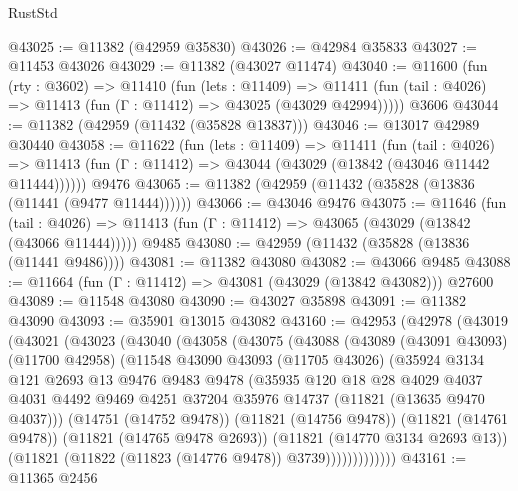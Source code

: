 \begin{lexlean}{RustStd}
\begin{coremodule}
@43025 := @11382 (@42959 @35830)
@43026 := @42984 @35833
@43027 := @11453 @43026
@43029 := @11382 (@43027 @11474)
@43040 := @11600
    (fun (rty : @3602) =>
    @11410
      (fun (lets : @11409) =>
      @11411 (fun (tail : @4026) => @11413 (fun (Γ : @11412) => @43025 (@43029 @42994)))))
    @3606
@43044 := @11382 (@42959 (@11432 (@35828 @13837)))
@43046 := @13017 @42989 @30440
@43058 := @11622
    (fun (lets : @11409) =>
    @11411
      (fun (tail : @4026) =>
      @11413 (fun (Γ : @11412) => @43044 (@43029 (@13842 (@43046 @11442 @11444))))))
    @9476
@43065 := @11382 (@42959 (@11432 (@35828 (@13836 (@11441 (@9477 @11444))))))
@43066 := @43046 @9476
@43075 := @11646
    (fun (tail : @4026) => @11413 (fun (Γ : @11412) => @43065 (@43029 (@13842 (@43066 @11444)))))
    @9485
@43080 := @42959 (@11432 (@35828 (@13836 (@11441 @9486))))
@43081 := @11382 @43080
@43082 := @43066 @9485
@43088 := @11664 (fun (Γ : @11412) => @43081 (@43029 (@13842 @43082))) @27600
@43089 := @11548 @43080
@43090 := @43027 @35898
@43091 := @11382 @43090
@43093 := @35901 @13015 @43082
@43160 := @42953
    (@42978
      (@43019
        (@43021
          (@43023
            (@43040
              (@43058
                (@43075
                  (@43088
                    (@43089
                      (@43091 @43093)
                      (@11700 @42958)
                      (@11548
                        @43090
                        @43093
                        (@11705 @43026)
                        (@35924
                          @3134
                          @121
                          @2693
                          @13
                          @9476
                          @9483
                          @9478
                          (@35935
                            @120
                            @18
                            @28
                            @4029
                            @4037
                            @4031
                            @4492
                            @9469
                            @4251
                            @37204
                            @35976
                            @14737
                            (@11821 (@13635 @9470 @4037)))
                          (@14751 (@14752 @9478))
                          (@11821 (@14756 @9478))
                          (@11821 (@14761 @9478))
                          (@11821 (@14765 @9478 @2693))
                          (@11821 (@14770 @3134 @2693 @13))
                          (@11821 (@11822 (@11823 (@14776 @9478)) @3739)))))))))))))
@43161 := @11365 @2456

\end{coremodule}
\end{lexlean}
